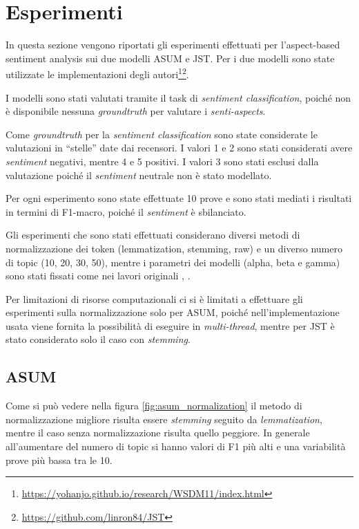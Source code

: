 \section{Esperimenti}
In questa sezione vengono riportati gli esperimenti effettuati per l'aspect-based sentiment analysis sui due modelli ASUM e JST. Per i due modelli sono state utilizzate le implementazioni degli autori\footnote{\url{https://yohanjo.github.io/research/WSDM11/index.html}}\footnote{\url{https://github.com/linron84/JST}}.

I modelli sono stati valutati tramite il task di \textit{sentiment classification}, poiché non è disponibile nessuna \textit{groundtruth} per valutare i \textit{senti-aspects}.

Come \textit{groundtruth} per la \textit{sentiment classification} sono state considerate le valutazioni in ``stelle'' date dai recensori. I valori 1 e 2 sono stati considerati avere \textit{sentiment} negativi, mentre 4 e 5 positivi. I valori 3 sono stati esclusi dalla valutazione poiché il \textit{sentiment} neutrale non è stato modellato.

Per ogni esperimento sono state effettuate 10 prove e sono stati mediati i risultati in termini di F1-macro, poiché il \textit{sentiment} è sbilanciato.

Gli esperimenti che sono stati effettuati considerano diversi metodi di normalizzazione dei token (lemmatization, stemming, raw) e un diverso numero di topic (10, 20, 30, 50), mentre i parametri dei modelli (alpha, beta e gamma) sono stati fissati come nei lavori originali \cite{jo2011aspect}, \cite{lin2009joint}.

Per limitazioni di risorse computazionali ci si è limitati a effettuare gli esperimenti sulla normalizzazione solo per ASUM, poiché nell'implementazione usata viene fornita la possibilità di eseguire in \textit{multi-thread}, mentre per JST è stato considerato solo il caso con \textit{stemming}.


\subsection{ASUM}

Come si può vedere nella figura \ref{fig:asum_normalization} il metodo di normalizzazione migliore risulta essere \textit{stemming} seguito da \textit{lemmatization}, mentre il caso senza normalizzazione risulta quello peggiore.
%
In generale all'aumentare del numero di topic si hanno valori di F1 più alti e una variabilità prove più bassa tra le 10.

